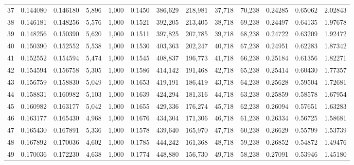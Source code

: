 \begin{tabular}{rrrrrrrrrrrrr}
37  &  0.144080 &  0.146180 &   5,896 &  1,000 &                                     0.1450 &  386,629 &  218,981 &   37,718 &   70,238 &  0.24285 &  0.65062 &  2.02843 \\
38  &  0.146181 &  0.148256 &   5,576 &  1,000 &                                     0.1521 &  392,205 &  213,405 &   38,718 &   69,238 &  0.24497 &  0.64135 &  1.97678 \\
39  &  0.148256 &  0.150390 &   5,620 &  1,000 &                                     0.1511 &  397,825 &  207,785 &   39,718 &   68,238 &  0.24722 &  0.63209 &  1.92472 \\
40  &  0.150390 &  0.152552 &   5,538 &  1,000 &                                     0.1530 &  403,363 &  202,247 &   40,718 &   67,238 &  0.24951 &  0.62283 &  1.87342 \\
41  &  0.152552 &  0.154594 &   5,474 &  1,000 &                                     0.1545 &  408,837 &  196,773 &   41,718 &   66,238 &  0.25184 &  0.61356 &  1.82271 \\
42  &  0.154594 &  0.156758 &   5,305 &  1,000 &                                     0.1586 &  414,142 &  191,468 &   42,718 &   65,238 &  0.25414 &  0.60430 &  1.77357 \\
43  &  0.156759 &  0.158830 &   5,049 &  1,000 &                                     0.1653 &  419,191 &  186,419 &   43,718 &   64,238 &  0.25628 &  0.59504 &  1.72681 \\
44  &  0.158831 &  0.160982 &   5,103 &  1,000 &                                     0.1639 &  424,294 &  181,316 &   44,718 &   63,238 &  0.25859 &  0.58578 &  1.67954 \\
45  &  0.160982 &  0.163177 &   5,042 &  1,000 &                                     0.1655 &  429,336 &  176,274 &   45,718 &   62,238 &  0.26094 &  0.57651 &  1.63283 \\
46  &  0.163177 &  0.165430 &   4,968 &  1,000 &                                     0.1676 &  434,304 &  171,306 &   46,718 &   61,238 &  0.26334 &  0.56725 &  1.58681 \\
47  &  0.165430 &  0.167891 &   5,336 &  1,000 &                                     0.1578 &  439,640 &  165,970 &   47,718 &   60,238 &  0.26629 &  0.55799 &  1.53739 \\
48  &  0.167892 &  0.170036 &   4,602 &  1,000 &                                     0.1785 &  444,242 &  161,368 &   48,718 &   59,238 &  0.26852 &  0.54872 &  1.49476 \\
49  &  0.170036 &  0.172230 &   4,638 &  1,000 &                                     0.1774 &  448,880 &  156,730 &   49,718 &   58,238 &  0.27091 &  0.53946 &  1.45180 \\

\end{tabular}
